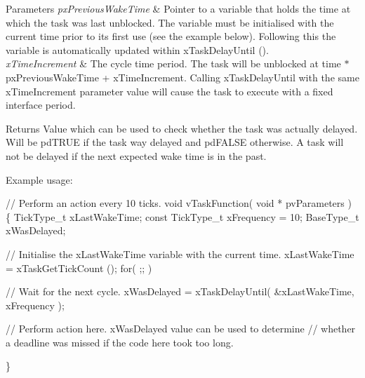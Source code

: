 \begin{DoxyParams}{Parameters}
{\em px\+Previous\+Wake\+Time} & Pointer to a variable that holds the time at which the task was last unblocked. The variable must be initialised with the current time prior to its first use (see the example below). Following this the variable is automatically updated within x\+Task\+Delay\+Until ().\\
\hline
{\em x\+Time\+Increment} & The cycle time period. The task will be unblocked at time $\ast$px\+Previous\+Wake\+Time + x\+Time\+Increment. Calling x\+Task\+Delay\+Until with the same x\+Time\+Increment parameter value will cause the task to execute with a fixed interface period.\\
\hline
\end{DoxyParams}
\begin{DoxyReturn}{Returns}
Value which can be used to check whether the task was actually delayed. Will be pd\+T\+R\+UE if the task way delayed and pd\+F\+A\+L\+SE otherwise. A task will not be delayed if the next expected wake time is in the past.
\end{DoxyReturn}
Example usage\+: 
\begin{DoxyPre}
// Perform an action every 10 ticks.
void vTaskFunction( void * pvParameters )
\{
TickType\_t xLastWakeTime;
const TickType\_t xFrequency = 10;
BaseType\_t xWasDelayed;
\begin{DoxyVerb}// Initialise the xLastWakeTime variable with the current time.
xLastWakeTime = xTaskGetTickCount ();
for( ;; )
{
    // Wait for the next cycle.
    xWasDelayed = xTaskDelayUntil( &xLastWakeTime, xFrequency );

    // Perform action here. xWasDelayed value can be used to determine
    // whether a deadline was missed if the code here took too long.
}
\end{DoxyVerb}

\}
\end{DoxyPre}
 